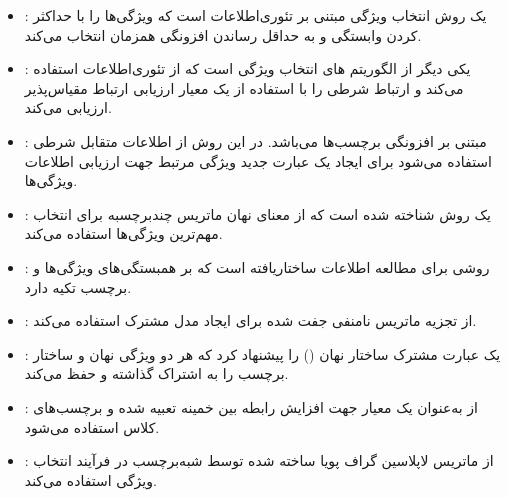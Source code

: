 \begin{itemize}
	
	\item {} \cite{lin2015multi}: یک روش ‌انتخاب ویژگی مبتنی بر تئوری‌اطلاعات است که ویژگی‌ها را با حداکثر کردن وابستگی و به حداقل رساندن افزونگی همزمان انتخاب می‌کند.
	
	\item {} \cite{lee2017scls}: یکی دیگر از الگوریتم های انتخاب ویژگی است که از تئوری‌اطلاعات استفاده می‌کند و ارتباط شرطی را با استفاده از یک معیار ارزیابی ارتباط مقیاس‌پذیر ارزیابی می‌کند.
	
	\item {} \cite{zhang2019distinguishing}: مبتنی بر افزونگی برچسب‌ها می‌باشد. در این روش از اطلاعات متقابل شرطی استفاده می‌شود برای ایجاد یک عبارت جدید ویژگی مرتبط جهت ارزیابی اطلاعات ویژگی‌ها.
	
	\item {} \cite{jian2016multi}: یک روش شناخته شده  است که از معنای نهان ماتریس چندبرچسبه برای انتخاب مهم‌ترین ویژگی‌ها استفاده می‌کند.
	
	\item {} \cite{braytee2017multi}: روشی برای مطالعه اطلاعات ساختار‌یافته است که بر همبستگی‌های ویژگی‌ها و برچسب تکیه دارد. 
	
	\item {} \cite{hu2020multi}: از تجزیه ماتریس نامنفی جفت شده برای ایجاد مدل مشترک استفاده می‌کند.
	
	\item {} \cite{gao2021multilabel}: یک عبارت مشترک ساختار نهان () را پیشنهاد کرد که هر دو ویژگی نهان و ساختار برچسب را به اشتراک گذاشته و حفظ می‌کند.
	
	\item {} \cite{huang2021multi}: از  به‌عنوان یک معیار جهت افزایش رابطه بین خمینه تعبیه شده و برچسب‌های کلاس استفاده می‌شود.
	
	\item {} \cite{zhang2022non}: از ماتریس لاپلاسین گراف پویا ساخته شده توسط شبه‌برچسب در فرآیند انتخاب ویژگی استفاده می‌کند.
	
\end{itemize}

